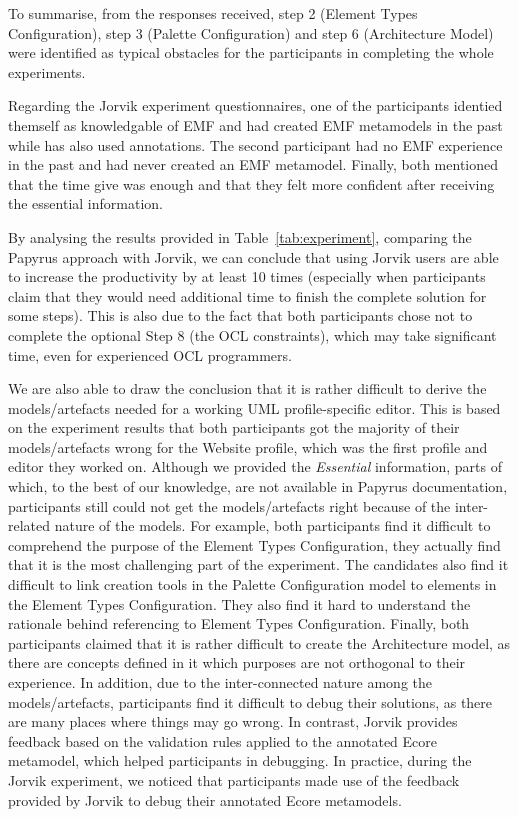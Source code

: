 To summarise, from the responses received, step 2 (Element Types Configuration), step 3 (Palette Configuration) and step 6 (Architecture Model) were identified as typical obstacles for the participants in completing the whole experiments. 

Regarding the Jorvik experiment questionnaires, one of the participants identied themself as knowledgable of EMF and had created EMF metamodels in the past while has also used annotations. The second participant had no EMF experience in the past and had never created an EMF metamodel. Finally, both mentioned that the time give was enough and that they felt more confident after receiving the essential information.

By analysing the results provided in Table~\ref{tab:experiment}, comparing the Papyrus approach with Jorvik, we can conclude that using Jorvik users are able to increase the productivity by at least 10 times (especially when participants claim that they would need additional time to finish the complete solution for some steps). This is also due to the fact that both participants chose not to complete the optional Step 8 (the OCL constraints), which may take significant time, even for experienced OCL programmers.

We are also able to draw the conclusion that it is rather difficult to derive the models/artefacts needed for a working UML profile-specific editor. 
This is based on the experiment results that both participants got the majority of their models/artefacts wrong for the Website profile, which was the first profile and editor they worked on.
Although we provided the \textit{Essential} information, parts of which, to the best of our knowledge, are not available in Papyrus documentation, participants still could not get the models/artefacts right because of the inter-related nature of the models.
For example, both participants find it difficult to comprehend the purpose of the Element Types Configuration, they actually find that it is the most challenging part of the experiment.
The candidates also find it difficult to link creation tools in the Palette Configuration model to elements in the Element Types Configuration. 
They also find it hard to understand the rationale behind referencing to Element Types Configuration.
Finally, both participants claimed that it is rather difficult to create the Architecture model, as there are concepts defined in it which purposes are not orthogonal to their experience.
In addition, due to the inter-connected nature among the models/artefacts, participants find it difficult to debug their solutions, as there are many places where things may go wrong.
In contrast, Jorvik provides feedback based on the validation rules applied to the annotated Ecore metamodel, which helped participants in debugging.
In practice, during the Jorvik experiment, we noticed that participants made use of the feedback provided by Jorvik to debug their annotated Ecore metamodels.

